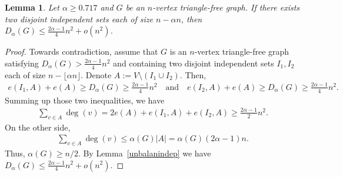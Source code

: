 \documentclass[11pt]{article}
\newtheorem{lemma}[theo]{Lemma}
\theoremstyle{definition}
\numberwithin{theo}{section}
\begin{document}
\begin{lemma}
\label{unbal2indep}
Let $\alpha\geq 0.717$ and $G$ be an $n$-vertex triangle-free graph. If there exists two disjoint independent sets each of size $n-\alpha n$, then  $D_\alpha(G)\leq \frac{2\alpha-1}{4}n^2+o(n^2)$.
\end{lemma}
\begin{proof}
Towards contradiction, assume that $G$ is an $n$-vertex triangle-free graph satisfying $D_\alpha(G)>\frac{2\alpha-1}{4}n^2$ and containing two disjoint independent sets $I_1,I_2$ each of size $n-\lfloor\alpha n\rfloor$. Denote $A:=V\setminus (I_1 \cup I_2)$.  Then,
\begin{align*}
    e(I_1,A)+e(A)\geq D_\alpha(G)\geq  \frac{2\alpha-1}{4}n^2 \quad \text{and} \quad     e(I_2,A)+e(A)\geq D_\alpha(G) \geq \frac{2\alpha-1}{4}n^2. 
\end{align*}
Summing up those two inequalities, we have
\begin{align}
\label{indepdegsum}
    \sum_{v\in A}\deg(v)=2e(A)+e(I_1,A)+e(I_2,A)\geq \frac{2\alpha-1}{2}n^2.
\end{align}
On the other side, 
\begin{align*}
    \sum_{v\in A}\deg(v)\leq \alpha(G)|A|=\alpha(G)(2\alpha-1)n.
\end{align*}
Thus, $\alpha(G)\geq n/2$. By Lemma~\ref{unbalanindep} we have $D_\alpha(G)\leq \frac{2\alpha-1}{4}n^2+o(n^2)$.

\end{proof}
\end{document}

